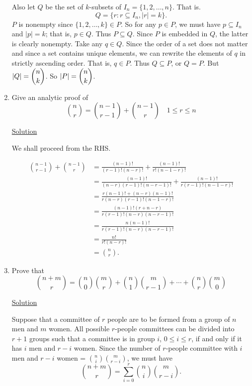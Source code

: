 \begin{enumerate}
Also let $Q$ be the set of $k$-subsets of $I_n = \{1, 2, \ldots, n\}$. That is.
\[Q = \{r : r \subseteq I_n, |r| = k\}.\]
$P$ is nonempty since $\{1, 2, \ldots, k\} \in P$. So for any $p \in P$, we must
have $p \subseteq I_n$ and $|p| = k$; that is, $p \in Q$. Thus $P \subseteq Q$.
Since $P$ is embedded in $Q$, the latter is clearly nonempty. Take any
$q \in Q$. Since the order of a set does not matter and since a set contains
unique elements, we can rewrite the elements of $q$ in strictly ascending order.
That is, $q \in P$. Thus $Q \subseteq P$, or $Q = P$. But $|Q| = \dbinom{n}{k}$.
So $|P| = \dbinom{n}{k}$.

\item Give an analytic proof of
\[\binom{n}{r} = \binom{n - 1}{r - 1} + \binom{n - 1}{r} \quad 1 \le r \le n\]

\underline{Solution}

We shall proceed from the RHS.

\begin{align*}
\binom{n - 1}{r - 1} + \binom{n - 1}{r} &=
\frac{(n - 1)!}{(r - 1)!(n - r)!} + \frac{(n - 1)!}{r!(n - 1 - r)!} \\
&= \frac{(n - 1)!}{(n - r)(r - 1)!(n - r - 1)!} +
\frac{(n - 1)!}{r(r - 1)!(n - 1 - r)!} \\
&= \frac{r(n - 1)! + (n - r)(n - 1)!}{r(n - r)(r - 1)!(n - 1 - r)!} \\
&= \frac{(n - 1)!(r + n - r)}{r(r - 1)!(n - r)(n - r - 1)!} \\
&= \frac{n(n - 1)!}{r(r - 1)!(n - r)(n - r - 1)!} \\
&= \frac{n!}{r!(n - r)!} \\
&= \binom{n}{r}.
\end{align*}

\item Prove that
\[\binom{n + m}{r} = \binom{n}{0}\binom{m}{r} + \binom{n}{1}\binom{m}{r - 1} +
\cdots + \binom{n}{r}\binom{m}{0}\]

\underline{Solution}

Suppose that a committee of $r$ people are to be formed from a group of $n$
men and $m$ women. All possible $r$-people committees can be divided into
$r + 1$ groups such that a committee is in group $i$, $0 \le i \le r$, if and
only if it has $i$ men and $r - i$ women. Since the number of $r$-people
committee with $i$ men and $r - i$ women = $\binom{n}{i}\binom{m}{r - i}$,
we must have
\[\binom{n + m}{r} = \sum_{i=0}^r\binom{n}{i}\binom{m}{r - i}.\]


\end{enumerate}
